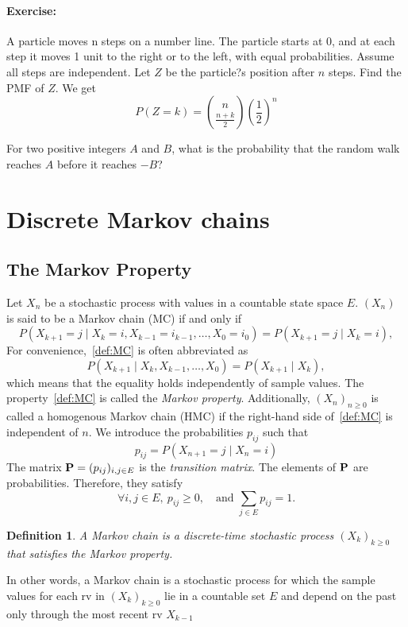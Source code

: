 \documentclass[12pt,a4paper]{article}
\newtheorem{definition}{Definition}
\newcommand{\bP}{\bold P}
\begin{document}
\paragraph{Exercise:} A particle moves n steps on a number line. 
	The particle starts at 0, and at each step it moves 1 unit to the right or to the left, with equal probabilities. 
	Assume all steps are independent. 
	Let $Z$ be the particle?s position after $n$ steps. Find the PMF of $Z$. We get
	$$ P(Z = k) = \binom{n}{\frac{n+k}{2}}\left(\frac{1}{2}\right)^n$$
	
	
	For two positive integers $A$ and $B$, what is the probability that the random walk reaches $A$ before it reaches $-B$?
	
	
\newpage
\section{Discrete Markov chains}
\subsection{The Markov Property}
Let $X_n$ be a stochastic process with values in a countable state space $E$. $(X_n)$ is said to be a Markov chain (MC) if and only if
\begin{equation}\label{def:MC}
P(X_{k+1} = j \mid X_k = i, X_{k-1} = i_{k-1}, \dots, X_0 = i_0) = P(X_{k+1} = j \mid X_k = i),
\end{equation}
For convenience,~\eqref{def:MC} is often abbreviated as 
\begin{equation}\label{def:MC}
	P(X_{k+1} \mid X_k, X_{k-1} , \dots, X_0) = P(X_{k+1} \mid X_k),
\end{equation}
which means that the equality holds independently of sample values.
The property~\eqref{def:MC} is called the \textit{Markov property}.
Additionally, $(X_n)_{n\geq 0}$ is called a homogenous Markov chain (HMC) if the right-hand side of~\eqref{def:MC} is independent of $n$.
We introduce the probabilities $p_{ij}$ such that
\begin{equation}
	p_{ij} =  P(X_{n+1} = j \mid X_n = i)
\end{equation}
The matrix $\bold P = (p_{ij})_{i,j\in E}$ is the \textit{transition matrix}.
The elements of $\bP$ are probabilities. Therefore, they satisfy
\begin{equation}
	 \forall i,j\in E, \ p_{ij}\geq 0,\quad \text{and } \sum_{j \in E} p_{ij} = 1.
\end{equation}
\begin{definition}
	A \textit{Markov chain} is a discrete-time stochastic process $(X_k)_{k\geq 0}$ that satisfies the Markov property.
	\end{definition}
	In other words, a Markov chain is a stochastic process for which the sample values for each rv in $(X_k)_{k\geq 0}$ lie in a countable set $E$ and depend on the past only through the most recent rv $X_{k-1}$
	
\end{document}
